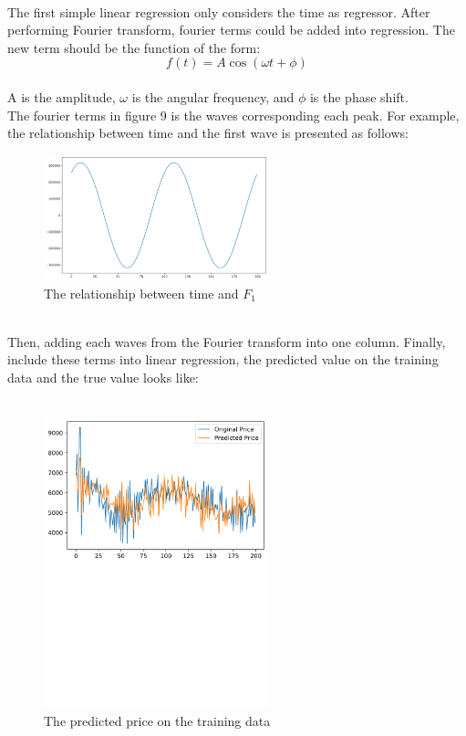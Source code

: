 \documentclass{article}
\begin{document}
\\
The first simple linear regression only considers the time as regressor. After performing Fourier transform, fourier terms could be added into regression.
The new term should be the function of the form:
\\
\begin{equation}
	f(t) = A\cos(\omega t + \phi )
\end{equation}
\\
A is the amplitude, $\omega$ is the angular frequency, and $\phi$ is the phase shift.\\
The fourier terms in figure 9 is the waves corresponding each peak. For example, the relationship between time and the first wave is presented as follows:
\\
\begin{figure}[htbp]\centering
	\includegraphics[width=6.5cm]{wave1.png}
	\caption{The relationship between time and $F_1$}
	\label{fig: Fourier Transfrom}	
\end{figure}
\\
Then, adding each waves from the Fourier transform into one column.
Finally, include these terms into linear regression, the predicted value on the training data and the true value looks like:
\\
\\
\begin{figure}[htbp]\centering
	\includegraphics[width=6.5cm]{Fourier_pred.pdf}
	\caption{The predicted price on the training data}
	\label{fig: Fourier Transform}
\end{figure}
\end{document}
